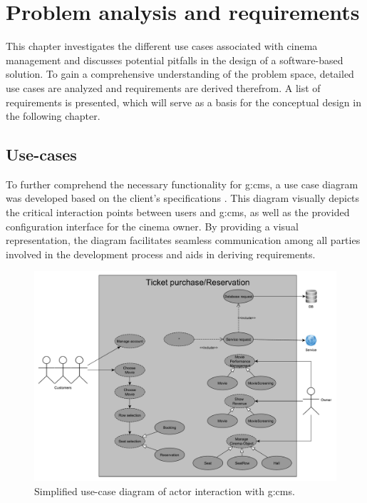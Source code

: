 \chapter{Problem analysis and requirements}
\label{ch:problem-analysis}

This chapter investigates the different use cases associated with cinema management and discusses potential pitfalls in the design of a software-based solution. To gain a comprehensive understanding of the problem space, detailed use cases are analyzed and requirements are derived therefrom. A list of requirements is presented, which will serve as a basis for the conceptual design in the following chapter.

\section{Use-cases}\label{sec:use-cases}

To further comprehend the necessary functionality for \gls{g:cms}, a use case diagram was developed based on the client's specifications \cite[1--2]{IIS2-ass}. This diagram visually depicts the critical interaction points between users and \gls{g:cms}, as well as the provided configuration interface for the cinema owner. By providing a visual representation, the diagram facilitates seamless communication among all parties involved in the development process and aids in deriving requirements.

\begin{figure}[H]
    \centering
    \includegraphics[width=\textwidth]{images/iis-use.case-new}
    \caption{Simplified use-case diagram of actor interaction with \gls{g:cms}.}
    \label{fig:use-cases}
\end{figure}

